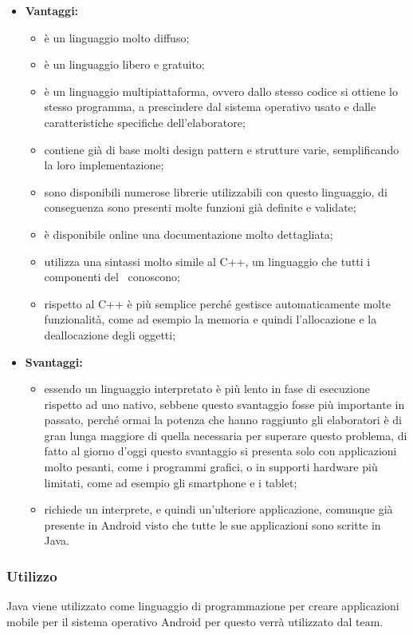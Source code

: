 	\begin{itemize}
		\item \textbf{Vantaggi:}
			\begin{itemize}
				\item è un linguaggio molto diffuso;
				\item è un linguaggio libero e gratuito; %
				\item è un linguaggio multipiattaforma, ovvero dallo stesso codice si ottiene lo stesso programma, a prescindere dal sistema operativo usato e dalle caratteristiche specifiche dell'elaboratore;
				\item contiene già di base molti design pattern e strutture varie, semplificando la loro implementazione;
				\item sono disponibili numerose librerie utilizzabili con questo linguaggio, di conseguenza sono presenti molte funzioni già definite e validate;
				\item è disponibile online una documentazione molto dettagliata;
				\item utilizza una sintassi molto simile al C++, un linguaggio che tutti i componenti del \ conoscono;
				\item rispetto al C++ è più semplice perché gestisce automaticamente molte funzionalità, come ad esempio la memoria e quindi l'allocazione e la deallocazione degli oggetti;
			\end{itemize}
		\item \textbf{Svantaggi:}
			\begin{itemize}
				\item essendo un linguaggio interpretato è più lento in fase di esecuzione rispetto ad uno nativo, sebbene questo svantaggio fosse più importante in passato, perché ormai la potenza che hanno raggiunto gli elaboratori è di gran lunga maggiore di quella necessaria per superare questo problema, di fatto al giorno d'oggi questo svantaggio si presenta solo con applicazioni molto pesanti, come i programmi grafici, o in supporti hardware più limitati, come ad esempio gli smartphone e i tablet;
				\item richiede un interprete, e quindi un'ulteriore applicazione, comunque già presente in Android visto che tutte le sue applicazioni sono scritte in Java.
			\end{itemize}
	\end{itemize}
	\subsubsection{Utilizzo}
	Java viene utilizzato come linguaggio di programmazione per creare applicazioni mobile per il sistema operativo Android per questo verrà utilizzato dal team.
	
